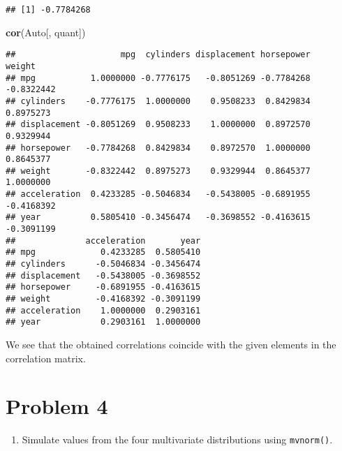 \documentclass[
]{article}
\newenvironment{Shaded}{\begin{snugshade}}{\end{snugshade}}
\newcommand{\FunctionTok}[1]{\textcolor[rgb]{0.13,0.29,0.53}{\textbf{#1}}}
\newcommand{\NormalTok}[1]{#1}
\providecommand{\tightlist}{%
  \setlength{\itemsep}{0pt}\setlength{\parskip}{0pt}}
\begin{document}
\begin{verbatim}
## [1] -0.7784268
\end{verbatim}

\begin{Shaded}
\begin{Highlighting}[]
\FunctionTok{cor}\NormalTok{(Auto[, quant])}
\end{Highlighting}
\end{Shaded}

\begin{verbatim}
##                     mpg  cylinders displacement horsepower     weight
## mpg           1.0000000 -0.7776175   -0.8051269 -0.7784268 -0.8322442
## cylinders    -0.7776175  1.0000000    0.9508233  0.8429834  0.8975273
## displacement -0.8051269  0.9508233    1.0000000  0.8972570  0.9329944
## horsepower   -0.7784268  0.8429834    0.8972570  1.0000000  0.8645377
## weight       -0.8322442  0.8975273    0.9329944  0.8645377  1.0000000
## acceleration  0.4233285 -0.5046834   -0.5438005 -0.6891955 -0.4168392
## year          0.5805410 -0.3456474   -0.3698552 -0.4163615 -0.3091199
##              acceleration       year
## mpg             0.4233285  0.5805410
## cylinders      -0.5046834 -0.3456474
## displacement   -0.5438005 -0.3698552
## horsepower     -0.6891955 -0.4163615
## weight         -0.4168392 -0.3091199
## acceleration    1.0000000  0.2903161
## year            0.2903161  1.0000000
\end{verbatim}

We see that the obtained correlations coincide with the given elements
in the correlation matrix.

\section{Problem 4}\label{problem-4}

\begin{enumerate}
\def\labelenumi{\alph{enumi})}
\tightlist
\item
  Simulate values from the four multivariate distributions using
  \texttt{mvnorm()}.
\end{enumerate}
\end{document}
